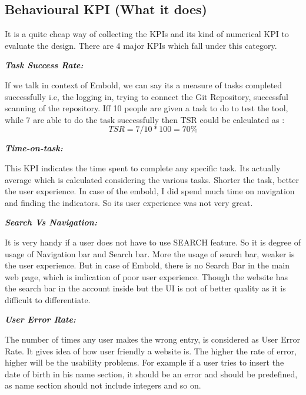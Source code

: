 \subsection{Behavioural KPI (What it does)}
It is a quite cheap way of collecting the KPIs and its kind of numerical KPI to evaluate the design. There are 4 major KPIs which fall under this category. \par
\textbf{\emph{Task Success Rate:}}\par
\indent If we talk in context of Embold, we can say its a measure of tasks completed successfully i.e, the logging in, trying to connect the Git Repository, successful scanning of the repository. 
Iff 10 people are given a task to do to test the tool, while 7 are able to do the task successfully then TSR could be calculated as :\[TSR= 7/10*100=70\%\]\par
\textbf{\emph{Time-on-task:}}\par
This KPI indicates the time spent to complete any specific task. Its actually average which is calculated considering the various tasks. Shorter the task, better the user experience. In case of the embold, I did spend much time on navigation and finding the indicators. So its user experience was not very great. \par
\textbf{\emph{Search Vs Navigation:}}\par
It is very handy if a user does not have to use SEARCH feature. So it is degree of usage of Navigation bar and Search bar. More the usage of search bar, weaker is the user experience. But in case of Embold, there is no Search Bar in the main web page, which is indication of poor user experience. Though the website has the search bar in the account inside but the UI is not of better quality as it is difficult to differentiate. \par

\textbf{\emph{User Error Rate:}}\par
The number of times any user makes the wrong entry, is considered as User Error Rate. It gives idea of how user friendly a website is.  The higher the rate of error, higher will be the usability problems. For example if a user tries to insert the date of birth in his name section, it should be an error and should be predefined, as name section should not include integers and so on. \par


